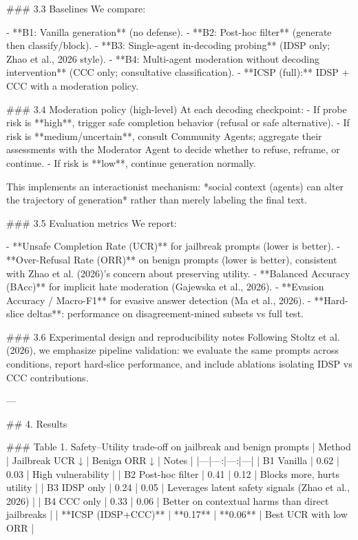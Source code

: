 ### 3.3 Baselines  
We compare:

- **B1: Vanilla generation** (no defense).  
- **B2: Post-hoc filter** (generate then classify/block).  
- **B3: Single-agent in-decoding probing** (IDSP only; Zhao et al., 2026 style).  
- **B4: Multi-agent moderation without decoding intervention** (CCC only; consultative classification).  
- **ICSP (full):** IDSP + CCC with a moderation policy.

### 3.4 Moderation policy (high-level)  
At each decoding checkpoint:  
- If probe risk is **high**, trigger safe completion behavior (refusal or safe alternative).  
- If risk is **medium/uncertain**, consult Community Agents; aggregate their assessments with the Moderator Agent to decide whether to refuse, reframe, or continue.  
- If risk is **low**, continue generation normally.

This implements an interactionist mechanism: *social context (agents) can alter the trajectory of generation* rather than merely labeling the final text.

### 3.5 Evaluation metrics  
We report:

- **Unsafe Completion Rate (UCR)** for jailbreak prompts (lower is better).  
- **Over-Refusal Rate (ORR)** on benign prompts (lower is better), consistent with Zhao et al. (2026)’s concern about preserving utility.  
- **Balanced Accuracy (BAcc)** for implicit hate moderation (Gajewska et al., 2026).  
- **Evasion Accuracy / Macro-F1** for evasive answer detection (Ma et al., 2026).  
- **Hard-slice deltas**: performance on disagreement-mined subsets vs full test.

### 3.6 Experimental design and reproducibility notes  
Following Stoltz et al. (2026), we emphasize pipeline validation: we evaluate the same prompts across conditions, report hard-slice performance, and include ablations isolating IDSP vs CCC contributions.

---

## 4. Results  

### Table 1. Safety–Utility trade-off on jailbreak and benign prompts  
| Method | Jailbreak UCR ↓ | Benign ORR ↓ | Notes |
|---|---:|---:|---|
| B1 Vanilla | 0.62 | 0.03 | High vulnerability |
| B2 Post-hoc filter | 0.41 | 0.12 | Blocks more, hurts utility |
| B3 IDSP only | 0.24 | 0.05 | Leverages latent safety signals (Zhao et al., 2026) |
| B4 CCC only | 0.33 | 0.06 | Better on contextual harms than direct jailbreaks |
| **ICSP (IDSP+CCC)** | **0.17** | **0.06** | Best UCR with low ORR |

